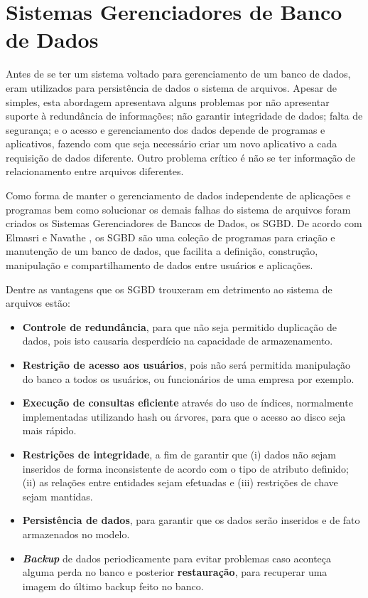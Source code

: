 \chapter{Sistemas Gerenciadores de Banco de Dados}
\label{sgbd}

Antes de se ter um sistema voltado para gerenciamento de um banco de dados, eram utilizados para persistência de dados o sistema de arquivos. 
Apesar de simples, esta abordagem apresentava alguns problemas por não apresentar suporte à redundância de informações; não garantir integridade de dados; 
falta de segurança; e o acesso e gerenciamento dos dados depende de programas e aplicativos, fazendo com que seja necessário criar um novo aplicativo a 
cada requisição de dados diferente. Outro problema crítico é não se ter informação de relacionamento entre arquivos diferentes.

Como forma de manter o gerenciamento de dados independente de aplicações e programas bem como solucionar os demais falhas do sistema de arquivos 
foram criados os Sistemas Gerenciadores de Bancos de Dados, os SGBD.  De acordo com Elmasri e Navathe \cite{navathe2011banco}, os SGBD são uma coleção de programas para 
criação e manutenção de um banco de dados, que facilita a definição, construção, manipulação e compartilhamento de dados entre usuários e aplicações.

Dentre as vantagens que os SGBD trouxeram em detrimento ao sistema de arquivos estão:

\begin{itemize}
    \item{\textbf{Controle de redundância}}, para que não seja permitido duplicação de dados, pois isto causaria desperdício na capacidade de armazenamento.
    \item{\textbf{Restrição de acesso aos usuários}}, pois não será permitida manipulação do banco a todos os usuários, ou funcionários de uma empresa por exemplo.
    \item{\textbf{Execução de consultas eficiente}} através do uso de índices, normalmente implementadas utilizando hash ou árvores, para que o acesso ao disco seja mais rápido.
    \item{\textbf{Restrições de integridade}}, a fim de garantir que (i) dados não sejam inseridos de forma inconsistente de acordo com o tipo de atributo definido; 
    (ii) as relações entre entidades sejam efetuadas e (iii) restrições de chave sejam mantidas.
    \item{\textbf{Persistência de dados}}, para garantir que os dados serão inseridos e de fato armazenados no modelo.
    \item{\textbf{\textit{Backup}}} de dados periodicamente para evitar problemas caso aconteça alguma perda no banco e posterior \textbf{restauração}, para recuperar uma imagem do último backup feito no banco.
\end{itemize}

